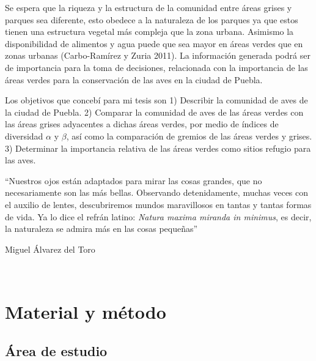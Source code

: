 \documentclass[letterpaper,12pt]{article}
\begin{document}
Se espera que la riqueza y la estructura de la comunidad entre áreas grises y parques sea diferente, esto obedece a la naturaleza de los parques ya que estos tienen una estructura vegetal más compleja que  la zona urbana. Asimismo la disponibilidad de alimentos y agua puede que sea mayor en áreas verdes que en zonas urbanas (Carbo-Ramírez y Zuria 2011).
La información generada podrá ser de importancia para la toma de decisiones, relacionada con la importancia de las  áreas verdes para la conservación de las aves en la ciudad de Puebla.

Los objetivos que concebí para mi tesis son 1) Describir la comunidad de aves de la ciudad de Puebla. 2) Comparar la comunidad de aves de las áreas verdes con las áreas grises adyacentes a dichas áreas verdes, por medio de índices de diversidad $\alpha$ y $\beta$, así como la comparación de gremios de las áreas verdes y grises. 3) Determinar la importancia relativa de las áreas verdes como sitios  refugio para las aves.
\newpage
{\linespread{1}
\epigraph{``Nuestros ojos están adaptados para mirar las cosas grandes, que no necesariamente son las más bellas. Observando detenidamente, muchas veces con el auxilio de lentes, descubriremos mundos maravillosos en tantas y tantas formas de vida. Ya lo dice el refrán latino: \textit{Natura maxima miranda in minimus}, es decir, la naturaleza se admira más en las cosas pequeñas''}{Miguel Álvarez del Toro}\\}

\section{Material y método}

\subsection{Área de estudio}
\end{document}
